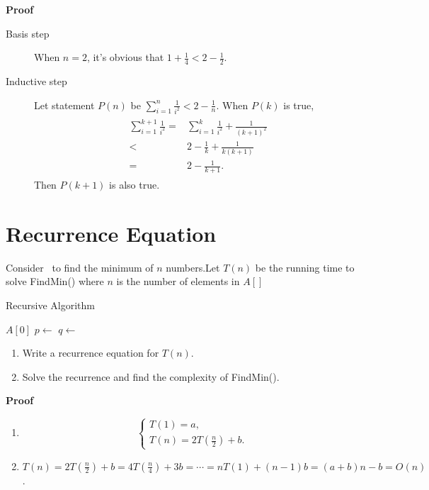 \documentclass{../../cls/sig-alternate-05-2015}
\begin{document}
\textbf{Proof} \begin{description}
    \item[Basis step] When $n = 2$,
    it's obvious that $1 + \frac{1}{4} < 2 - \frac{1}{2}$.
    \item[Inductive step] Let statement $P(n)$ be $\sum_{i = 1}^{n} \frac{1}{i^2} < 2 - \frac{1}{n}$. When $P(k)$ is true, \begin{align}
    \begin{aligned}
    \sum_{i = 1}^{k + 1} \frac{1}{i^2} = & \sum_{i = 1}^{k} \frac{1}{i^2} + \frac{1}{(k + 1)^2}\\
    < & 2 - \frac{1}{k} + \frac{1}{k(k + 1)}\\
    = & 2 - \frac{1}{k + 1}.
    \end{aligned}
    \end{align}
    Then $P(k + 1)$ is also true.
\end{description}

\section{Recurrence Equation}
Consider~ to find the minimum of
$n$ numbers.Let $T(n)$ be the running time to solve FindMin() where $n$ is the number of elements in $A[]$
\begin{algorithm}[H]
    \caption{Recursive Algorithm}
    \label{a:3}
    \begin{algorithmic}
        \State \Return $A[0]$
        \Else
        \State $p \leftarrow$ 
        \State $q \leftarrow$ 
        \State \Return {}
        \EndIf
        \EndProcedure
    \end{algorithmic}
\end{algorithm}
\begin{enumerate}
    \item Write a recurrence equation for $T(n)$.
    \item Solve the recurrence and find the complexity of FindMin().
\end{enumerate}

\textbf{Proof} \begin{enumerate}
    \item \begin{equation}
    \begin{cases}
    T(1) = a,\\
    T(n) = 2T(\frac{n}{2}) + b.
    \end{cases}
    \end{equation}
    \item $T(n) = 2T(\frac{n}{2}) + b = 4T(\frac{n}{4}) + 3b = \cdots = nT(1) + (n - 1)b = (a + b)n - b = O(n)$.
\end{enumerate}
\end{document}
